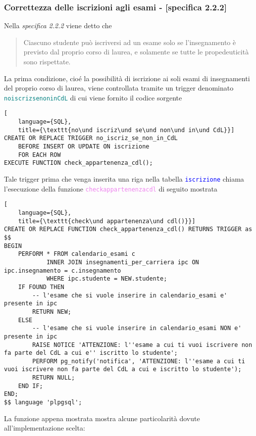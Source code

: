 \documentclass{article}
\newcommand{\tabb}[1]{\texttt{\textcolor{blue}{#1}}}
\newcommand{\sqlfunc}[1]{\texttt{\textcolor{violet}{#1}}}
\newcommand{\sqltrigger}[1]{\texttt{\textcolor{teal}{#1}}}
\newcommand{\und}[0]{\textunderscore}
\begin{document}
\subsubsection{Correttezza delle iscrizioni agli esami - [specifica 2.2.2]}
Nella \textit{specifica 2.2.2} viene detto che
\begin{quote}
    Ciascuno studente può iscriversi ad un esame solo se l'insegnamento è previsto dal proprio corso di laurea, e solamente se tutte le propedeuticità sono rispettate.
\end{quote}
La prima condizione, cioé la possibilità di iscrizione ai soli esami di insegnamenti del proprio corso di laurea, viene controllata tramite un trigger denominato \sqltrigger{no\und iscriz\und se\und non\und in\und CdL} di cui viene fornito il codice sorgente
\begin{lstlisting}[
    language={SQL},
    title={\texttt{no\und iscriz\und se\und non\und in\und CdL}}]
CREATE OR REPLACE TRIGGER no_iscriz_se_non_in_CdL
    BEFORE INSERT OR UPDATE ON iscrizione
    FOR EACH ROW
EXECUTE FUNCTION check_appartenenza_cdl();
\end{lstlisting}
Tale trigger prima che venga inserita una riga nella tabella \tabb{iscrizione} chiama l'esecuzione della funzione \sqlfunc{check\und appartenenza\und cdl} di seguito mostrata
\begin{lstlisting}[
    language={SQL},
    title={\texttt{check\und appartenenza\und cdl()}}]
CREATE OR REPLACE FUNCTION check_appartenenza_cdl() RETURNS TRIGGER as $$
BEGIN
    PERFORM * FROM calendario_esami c
            INNER JOIN insegnamenti_per_carriera ipc ON ipc.insegnamento = c.insegnamento
            WHERE ipc.studente = NEW.studente;
    IF FOUND THEN
        -- l'esame che si vuole inserire in calendario_esami e' presente in ipc
        RETURN NEW;
    ELSE
        -- l'esame che si vuole inserire in calendario_esami NON e' presente in ipc
        RAISE NOTICE 'ATTENZIONE: l''esame a cui ti vuoi iscrivere non fa parte del CdL a cui e'' iscritto lo studente';
        PERFORM pg_notify('notifica', 'ATTENZIONE: l''esame a cui ti vuoi iscrivere non fa parte del CdL a cui e iscritto lo studente');
        RETURN NULL;
    END IF;
END;
$$ language 'plpgsql';
\end{lstlisting}
La funzione appena mostrata mostra alcune particolarità dovute all'implementazione scelta:
\end{document}
